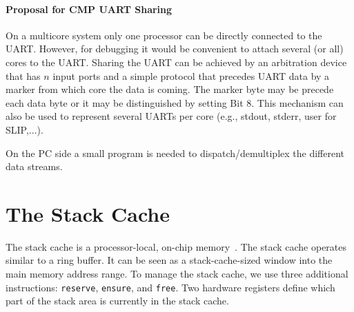 \documentclass[a4paper,fontsize=10pt,twoside,DIV15,BCOR12mm,headinclude=true,footinclude=false,pagesize,bibtotoc]{scrbook}
\newcommand{\code}[1]{{\texttt{#1}}}
\newcommand{\comment}[3]{

\textsf{\textbf{#1}} {\color{#3}#2}}
\newcommand{\martin}[1]{\comment{Martin}{#1}{Blue}}
\newcommand{\stefan}[1]{\comment{Stefan}{#1}{RoyalPurple}}
\renewcommand{\martin}[1]{}
\renewcommand{\stefan}[1]{}
\begin{document}
\paragraph{Proposal for CMP UART Sharing}
On a multicore system only one processor can be directly connected to the
UART. However, for debugging it would be convenient to attach several (or all)
cores to the UART. Sharing the UART can be achieved by an arbitration device
that has $n$ input ports and a simple protocol that precedes UART data by a
marker from which core the data is coming. The marker byte may be precede
each data byte or it may be distinguished by setting Bit 8. This mechanism can
also be used to represent several UARTs per core (e.g., stdout, stderr, user for SLIP,...).
\martin{The protocol shall be done in HW -- let's find a student for this.}

On the PC side a small program is needed to dispatch/demultiplex the different
data streams.

\stefan{Would be nice to be able to insert control bytes to flush the output as well, but that must be understood by the simulator as well (it
must flush its output stream).

With multiple cores writing to the UART, we need to prevent mixing up control bytes and data bytes from different cores, so I assume adding
the control bytes to is done by hardware? We could also designate one core to I/O and communicate over SPMs with the other cores, although it
adds another layer of potential bugs to the debugging process.}

\martin{Yes, the idea is that the UARTs look simple for all cores and the HW does the arbitration and additional control byte. However, no one is assigned this task :-(}

\martin{Other I/O (and using a dedicated core) is application dependent and not the topic of this report.}





\section{The Stack Cache}
\label{sec:stack-cache}

The stack cache is a processor-local, on-chip memory~\cite{patmos:stack:seus}. The stack
cache operates similar to a ring buffer. It can be seen as a stack-cache-sized
window into the main memory address range.
To manage the stack cache, we use three additional
instructions: \code{reserve}, \code{ensure},
and \code{free}. Two hardware registers define which
part of the stack area is currently in the stack cache.
\end{document}
